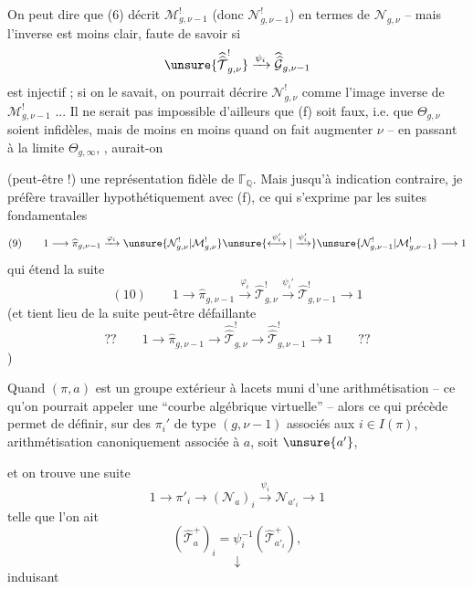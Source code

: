 On peut dire que (6) décrit $\mathcal M_{g,\nu-1}^{!}$ (donc $\mathcal N_{g,\nu-1}^{!}$) en termes de $\mathcal N_{g,\nu}$ -- mais l'inverse est moins clair, faute de savoir si
\[
\unsure{\widehat{\widehat{\mathcal T}}_{g,\nu}^{!}}
\xrightarrow{\psi_i}
\widehat{\widehat{\mathcal G}}_{g,\nu-1}
\]
est injectif ; si on le savait, on pourrait décrire $\mathcal N_{g,\nu}^{!}$ comme l'image inverse de $\mathcal M_{g,\nu-1}^{!}$ ...  Il ne serait pas impossible d'ailleurs que (f) soit faux, i.e. que  $\Theta_{g,\nu}$ soient infidèles, mais de moins en moins quand on fait augmenter $\nu$ -- en passant à la limite  $\Theta_{g,\infty}$, , aurait-on


(peut-être !) une représentation fidèle de $\mathbb{\Gamma}_{\mathbb Q}$. Mais jusqu'à indication contraire, je préfère travailler hypothétiquement avec (f), ce qui s'exprime par les suites  fondamentales
\[
(9)\qquad
1\longrightarrow\widehat{\pi}_{g,\nu-1}
\xrightarrow{\varphi_i}
\unsure{\mathcal N_{g,\nu}^{!}|\mathcal M_{g,\nu}^{!}}
\unsure{\overset{\psi_i'}{\longleftrightarrow}|\xrightarrow{\psi_i'}}
\unsure{\mathcal N_{g,\nu-1}^{!}|\mathcal M_{g,\nu-1}^{!}}
\longrightarrow1
\]
qui étend la suite 
\[
(10)\qquad
1\longrightarrow\widehat{\pi}_{g,\nu-1}
\xrightarrow{\varphi_i}
\widehat{\mathcal T}_{g,\nu}^{!}
\xrightarrow{\psi_i'}
\widehat{\mathcal T}_{g,\nu-1}^{!}
\longrightarrow1
\]
(et tient lieu de la suite  peut-être défaillante
\[
??\qquad
1\longrightarrow\widehat{\pi}_{g,\nu-1}
\longrightarrow\widehat{\widehat{\mathcal T}}_{g,\nu}^{!}
\longrightarrow\widehat{\widehat{\mathcal T}}_{g,\nu-1}^{!}
\longrightarrow1
\qquad??
\]
)

Quand $(\pi,a)$ est un groupe extérieur à lacets muni d'une arithmétisation -- ce qu'on pourrait appeler une ``courbe algébrique virtuelle'' -- alors ce qui précède permet de définir, sur  des $\pi_i'$ de type $(g,\nu-1)$ associés aux $i\in I(\pi)$,  arithmétisation canoniquement associée à $a$, soit $\unsure{a'}$,


et on trouve  une suite 
\[
1 \longrightarrow \pi'_i \longrightarrow (\mathcal{N}_a)_i
\xrightarrow{\psi_i} \mathcal{N}_{a'_i} \longrightarrow 1
\tag{11}
\]
telle que l'on ait
\[
(\widehat{\mathcal{T}}^{+}_a)_i
=\psi_i^{-1}(\widehat{\mathcal{T}}^{+}_{a'_i}),
\tag{12}
\]
\[
\downarrow
\]
induisant

